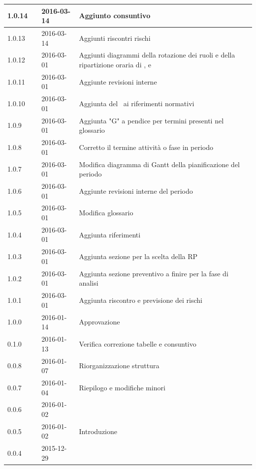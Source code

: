 \documentclass[12pt,a4paper]{article}
\begin{document}
\begin{center}
\begin{longtable}[H]{p{} p{} p{} p{}}
        \midrule
        1.0.14 & \AB{} & 2016-03-14 & Aggiunto consuntivo \FAD{} \\*
        \midrule
        1.0.13 & \AB{} & 2016-03-14 & Aggiunti riscontri rischi \FAD{} \\*
        \midrule
	    1.0.12 & \AB{} & 2016-03-01 & Aggiunti diagrammi della rotazione dei ruoli e della ripartizione oraria di \FAD, \FPA e \FPD{} \\*
        \midrule
        1.0.11 & \AB{} & 2016-03-01 & Aggiunte revisioni interne \\*
		\midrule
		1.0.10 & \AB{} & 2016-03-01 & Aggiunta del \PdQ\ ai riferimenti normativi \\*		
		\midrule
		1.0.9 & \AB{} & 2016-03-01 & Aggiunta "G" a pendice per termini presenti nel glossario \\*
		\midrule
		1.0.8 & \AB{} & 2016-03-01 & Corretto il termine attività o fase in periodo \\*
		\midrule
		1.0.7 & \AB{} & 2016-03-01 & Modifica diagramma di Gantt della pianificazione del periodo \FP\  \\*
		\midrule
		1.0.6 & \AB{} & 2016-03-01 & Aggiunte revisioni interne del periodo \FP\ \\*
		\midrule
		1.0.5 & \AB{} & 2016-03-01 & Modifica glossario \\*
		\midrule
		1.0.4 & \AB{} & 2016-03-01 & Aggiunta riferimenti \\*
		\midrule
		1.0.3 & \AB{} & 2016-03-01 & Aggiunta sezione per la scelta della RP \\*
		\midrule
		1.0.2 & \AB{} & 2016-03-01 & Aggiunta sezione preventivo a finire per la fase di analisi \\*
		\midrule
		1.0.1 & \AB{} & 2016-03-01 & Aggiunta riscontro e previsione dei rischi \\*
		\midrule
		1.0.0 & \NDC{} & 2016-01-14 & Approvazione \\*
		\midrule
		0.1.0 & \AVE{} & 2016-01-13 & Verifica correzione tabelle e consuntivo  \FA{} \\*
		\midrule
		0.0.8 & \TP{} & 2016-01-07 & Riorganizzazione struttura \\*
		\midrule
		0.0.7 & \NDC{} & 2016-01-04 & Riepilogo e modifiche minori \\*
		\midrule
		0.0.6 & \WS{} & 2016-01-02 &  \FVV{} \\*
		\midrule
		0.0.5 & \WS{} & 2016-01-02 &  Introduzione \\*
		\midrule
		0.0.4 & \TP{} & 2015-12-29 &  \FPDC{} \\*

\end{longtable}
\end{center}
\end{document}
